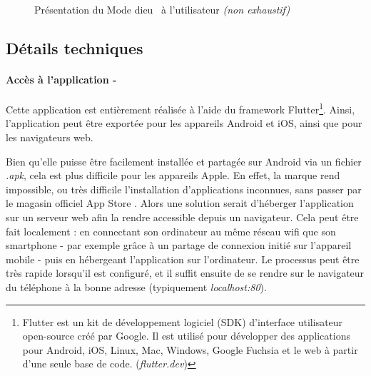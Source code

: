 \documentclass[a4paper]{article}
\begin{document}
\begin{figure}[hb]
\begin{center}
{      \label{sub:guide_welcome_god_mode}
    }
    \caption{\centering Présentation du \og Mode dieu \fg\ à l'utilisateur \textit{(non exhaustif)}}
    \label{fig:god_mode_guide}
  \end{center}
\end{figure}



\clearpage



\subsection{Détails techniques}
\paragraph*{Accès à l'application - }
Cette application est entièrement réalisée à l'aide du framework
Flutter\footnote{Flutter est un kit de développement logiciel (SDK)
  d'interface utilisateur open-source créé par Google. Il est utilisé
  pour développer des applications pour Android, iOS, Linux, Mac, Windows,
  Google Fuchsia et le web à partir d'une seule base de code. (\textit{flutter.dev})}.
Ainsi, l'application peut être exportée pour les appareils Android et
iOS, ainsi que pour les navigateurs web.

Bien qu'elle puisse être facilement installée et partagée sur Android via un fichier \textit{.apk},
cela est plus difficile pour les appareils Apple. En effet, la marque rend impossible, ou très difficile
l'installation d'applications inconnues, sans passer par le magasin officiel \og App Store \fg. Alors
une solution serait d'héberger l'application sur un serveur web afin la rendre accessible depuis un navigateur.
Cela peut être fait localement : en connectant son ordinateur au même réseau wifi que son smartphone -
par exemple grâce à un partage de connexion initié sur l'appareil mobile - puis en hébergeant l'application
sur l'ordinateur. Le processus peut être très rapide lorsqu'il est configuré, et il suffit ensuite de se rendre
sur le navigateur du téléphone à la bonne adresse (typiquement \textit{localhost:80}).
\end{document}
